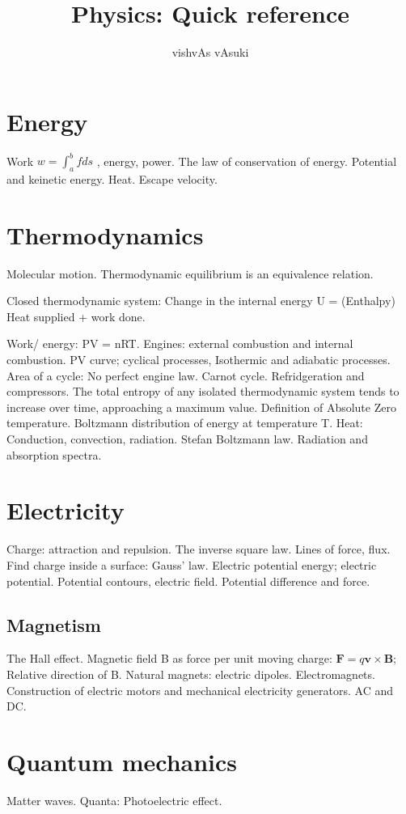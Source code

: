 \documentclass{article}
\title{Physics: Quick reference}
\author{vishvAs vAsuki}
\begin{document}
\maketitle

\section{Energy}
Work $w = \int_{a}^{b}fds$ , energy, power. The law of conservation of energy. Potential and keinetic energy. Heat. Escape velocity.

\section{Thermodynamics}
Molecular motion. Thermodynamic equilibrium is an equivalence relation.

Closed thermodynamic system: Change in the internal energy U = (Enthalpy) Heat supplied + work done.

Work/ energy: PV = nRT. Engines: external combustion and internal combustion. PV curve; cyclical processes, Isothermic and adiabatic processes. Area of a cycle: No perfect engine law. Carnot cycle. Refridgeration and compressors. The total entropy of any isolated thermodynamic system tends to increase over time, approaching a maximum value. Definition of Absolute Zero temperature. Boltzmann distribution of energy at temperature T. Heat: Conduction, convection, radiation. Stefan Boltzmann law. Radiation and absorption spectra.

\section{Electricity}
Charge: attraction and repulsion. The inverse square law. Lines of force, flux. Find charge inside a surface: Gauss' law. Electric potential energy; electric potential. Potential contours, electric field. Potential difference and force.

\subsection{Magnetism}
The Hall effect. Magnetic field B as force per unit moving charge: $\textbf{F} = q\textbf{v}\times\textbf{B}$; Relative direction of B. Natural magnets: electric dipoles. Electromagnets. Construction of electric motors and mechanical electricity generators. AC and DC.

\section{Quantum mechanics}
Matter waves. Quanta: Photoelectric effect.
\end{document}
